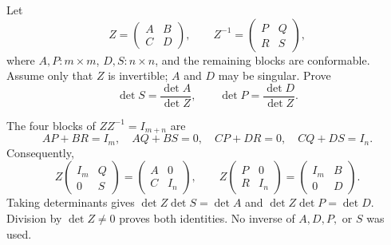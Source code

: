 \begin{problem}\label{ex:05:inverse-minors}
Let
\[
Z=\begin{pmatrix}A&B\\C&D\end{pmatrix},\qquad
Z^{-1}=\begin{pmatrix}P&Q\\R&S\end{pmatrix},
\]
where \(A,P:m\times m\), \(D,S:n\times n\), and the remaining blocks
are conformable. Assume only that \(Z\) is invertible; \(A\) and \(D\)
may be singular. Prove
\[
\det S=\frac{\det A}{\det Z},\qquad
\det P=\frac{\det D}{\det Z}.
\]
\end{problem}
\begin{solution}
The four blocks of \(ZZ^{-1}=I_{m+n}\) are
\[
AP+BR=I_m,\quad AQ+BS=0,\quad CP+DR=0,\quad CQ+DS=I_n.
\]
Consequently,
\[
Z\begin{pmatrix}I_m&Q\\0&S\end{pmatrix}
=\begin{pmatrix}A&0\\C&I_n\end{pmatrix},\qquad
Z\begin{pmatrix}P&0\\R&I_n\end{pmatrix}
=\begin{pmatrix}I_m&B\\0&D\end{pmatrix}.
\]
Taking determinants gives \(\det Z\det S=\det A\) and
\(\det Z\det P=\det D\). Division by \(\det Z\ne0\) proves both
identities. No inverse of \(A,D,P,\) or \(S\) was used.
\end{solution}

